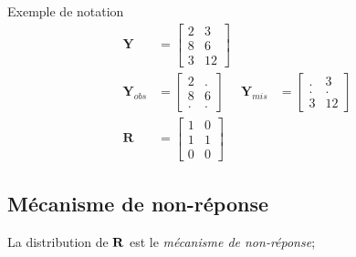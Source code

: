 \documentclass[10pt, french]{article}
\begin{document}
\begin{multicols*}{3}
\begin{examplebox}{Exemple de notation}
\begin{align*}
	\bm{Y}	
	&=	\begin{bmatrix}
		2	&	3	\\
		8	&	6	\\
		3	&	12	
		\end{bmatrix}	\\
	\bm{Y}_{obs}
	&=	\begin{bmatrix}
		2	&	.	\\
		8	&	6	\\
		.	&	.
		\end{bmatrix}	&
	\bm{Y}_{mis}
	&=	\begin{bmatrix}
		.	&	3	\\
		.	&	.	\\
		3	&	12	
		\end{bmatrix}	\\
	\bm{R}
	&=	\begin{bmatrix}
		1	&	0	\\
		1	&	1	\\
		0	&	0	
		\end{bmatrix}	
\end{align*}
\end{examplebox}

\subsection*{Mécanisme de non-réponse}
La distribution de $\mathbf{R}$ est le \textit{mécanisme de non-réponse};


\end{multicols*}
\end{document}
